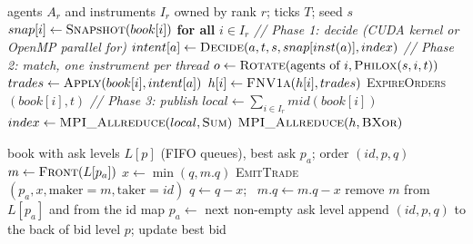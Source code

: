 \begin{algorithm}[t]
\caption{Barrier-synchronised tick loop (per MPI rank)}
\label{alg:tick}
\footnotesize
\begin{algorithmic}[1]
\Require agents $A_r$ and instruments $I_r$ owned by rank $r$; ticks $T$; seed $s$
  \State $snap[i] \gets \textsc{Snapshot}(book[i])$ \textbf{for all} $i \in I_r$
  \State \textit{// Phase 1: decide (CUDA kernel or OpenMP parallel for)}
    \State $intent[a] \gets \textsc{Decide}(a, t, s, snap[inst(a)], index)$
  \EndFor
  \State \textit{// Phase 2: match, one instrument per thread}
    \State $o \gets \textsc{Rotate}(\text{agents of } i, \textsc{Philox}(s,i,t))$
      \State $trades \gets \textsc{Apply}(book[i], intent[a])$ 
      \State $h[i] \gets \textsc{FNV1a}(h[i], trades)$
    \EndFor
    \State \textsc{ExpireOrders}$(book[i], t)$
  \EndFor
  \State \textit{// Phase 3: publish}
  \State $local \gets \sum_{i\in I_r} mid(book[i])$ 
  \State $index \gets \textsc{MPI\_Allreduce}(local, \textsc{Sum})$ 
\EndFor
\State \Return $\textsc{MPI\_Allreduce}(h, \textsc{BXor})$ 
\end{algorithmic}
\end{algorithm}

\begin{algorithm}[t]
\caption{Match a limit buy order (price--time priority)}
\label{alg:match}
\footnotesize
\begin{algorithmic}[1]
\Require book with ask levels $L[p]$ (FIFO queues), best ask $p_a$; order $(id, p, q)$
  \State $m \gets \textsc{Front}(L[p_a])$ 
  \State $x \gets \min(q, m.q)$
  \State \textsc{EmitTrade}$(p_a, x, \text{maker}=m, \text{taker}=id)$
  \State $q \gets q - x$; \ $m.q \gets m.q - x$
    \State remove $m$ from $L[p_a]$ and from the id map
     \State $p_a \gets$ next non-empty ask level \EndIf
  \EndIf
\EndWhile
{} \State append $(id, p, q)$ to the back of bid level $p$; update best bid \EndIf
\end{algorithmic}
\end{algorithm}

